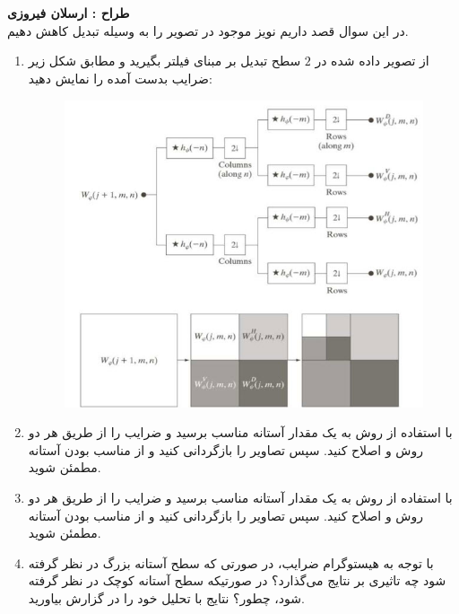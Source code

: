 \documentclass[a4]{article}
\begin{document}
\section{}
\textbf{طراح :‌ ارسلان فیروزی}
\vspace{0.5cm}
\\
در این سوال قصد داریم نویز موجود در تصویر
 را به وسیله تبدیل
کاهش دهیم.
\begin{enumerate}
	\item 
از تصویر داده شده در $ 2 $ سطح تبدیل
 بر مبنای فیلتر
بگیرید و مطابق شکل زیر ضرایب بدست آمده را نمایش دهید:
	\begin{figure}[H]
		\centering
		\includegraphics[width=0.7 \linewidth]{q3}
		\caption{
		}
		\label{q3}
	\end{figure}
	\item 
با استفاده از روش
 به یک مقدار آستانه مناسب برسید و ضرایب را از طریق هر دو روش 
 و 
 اصلاح کنید. سپس تصاویر را بازگردانی کنید و از مناسب بودن آستانه مطمئن شوید. 
	\item 
با استفاده از روش
 به یک مقدار آستانه مناسب برسید و ضرایب را از طریق هر دو روش 
و 
 اصلاح کنید. سپس تصاویر را بازگردانی کنید و از مناسب بودن آستانه مطمئن شوید. 
	\item 
با توجه به هیستوگرام ضرایب، در صورتی که سطح آستانه بزرگ در نظر گرفته شود چه تاثیری بر نتایج می‌‌گذارد؟ در صورتیکه سطح آستانه کوچک در نظر گرفته شود، چطور؟ نتایج با تحلیل خود را در گزارش بیاورید.
	
\end{enumerate}
\end{document}
